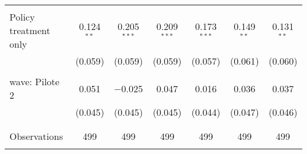 \begin{tabular}{@{\extracolsep{5pt}}lcccccc}
  & & & & & & \\ 
 Policy treatment only & 0.124$^{**}$ & 0.205$^{***}$ & 0.209$^{***}$ & 0.173$^{***}$ & 0.149$^{**}$ & 0.131$^{**}$ \\ 
  & (0.059) & (0.059) & (0.059) & (0.057) & (0.061) & (0.060) \\ 
  & & & & & & \\ 
 wave: Pilote 2 & 0.051 & $-$0.025 & 0.047 & 0.016 & 0.036 & 0.037 \\ 
  & (0.045) & (0.045) & (0.045) & (0.044) & (0.047) & (0.046) \\ 
  & & & & & & \\ 
\hline \\[-1.8ex] 

Observations & 499 & 499 & 499 & 499 & 499 & 499 \\ 
\hline 
\hline \\[-1.8ex] 
\end{tabular} 
